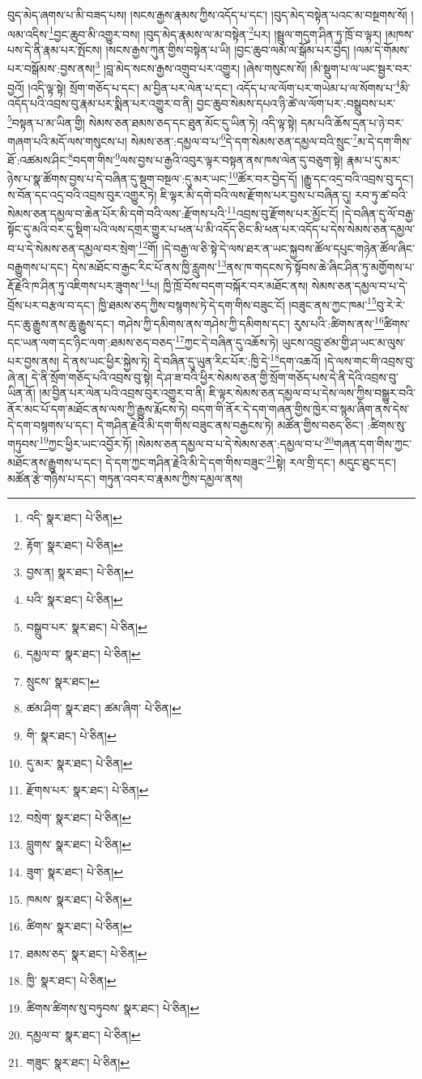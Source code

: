 བུད་མེད་ཞགས་པ་མི་བཟད་པས། །སངས་རྒྱས་རྣམས་ཀྱིས་འདོད་པ་དང་། །བུད་མེད་བསྟེན་པའང་མ་བསྔགས་སོ། །ལམ་འདིས་\footnote{འདི་  སྣར་ཐང་།  པེ་ཅིན། }བྱང་ཆུབ་མི་འགྱུར་བས། །བུད་མེད་རྣམས་ལ་མ་བསྟེན་\footnote{རྟོག་  སྣར་ཐང་།  པེ་ཅིན། }པར། །སྦྲུལ་གདུག་ཤིན་ཏུ་ཁྲོ་བ་ལྟར། །མཁས་པས་དེ་ནི་རྣམ་པར་སྤོངས། །སངས་རྒྱས་ཀུན་གྱིས་བསྟེན་པ་ཡི། །བྱང་ཆུབ་ལམ་ལ་སྒོམ་པར་བྱེད། །ལམ་དེ་གོམས་པར་བསྒོམས་:བྱས་ནས།\footnote{བྱས་ན།  སྣར་ཐང་།  པེ་ཅིན། } །བླ་མེད་སངས་རྒྱས་འགྲུབ་པར་འགྱུར། །ཞེས་གསུངས་སོ། །མི་སྡུག་པ་ལ་ཡང་སྦྱར་བར་བྱའོ། །འདི་ལྟ་སྟེ། སྲོག་གཅོད་པ་དང་། མ་བྱིན་པར་ལེན་པ་དང་། འདོད་པ་ལ་ལོག་པར་གཡེམ་པ་ལ་སོགས་པ་\footnote{པའི་  སྣར་ཐང་།  པེ་ཅིན། }མི་འདོད་པའི་འབྲས་བུ་རྣམ་པར་སྨིན་པར་འགྱུར་བ་ནི། བྱང་ཆུབ་སེམས་དཔའ་ཉི་ཚེ་ལ་ལོག་པར་:བསྒྲུབས་པར་\footnote{བསྒྲུབ་པར་  སྣར་ཐང་།  པེ་ཅིན། }བསྟན་པ་མ་ཡིན་གྱི། སེམས་ཅན་ཐམས་ཅད་དང་ཐུན་མོང་དུ་ཡིན་ཏེ། འདི་ལྟ་སྟེ། དམ་པའི་ཆོས་དྲན་པ་ཉེ་བར་གཞག་པའི་མདོ་ལས་གསུངས་པ། སེམས་ཅན་:དམྱལ་བ་པ་\footnote{དམྱལ་བ་  སྣར་ཐང་།  པེ་ཅིན། }དེ་དག་སེམས་ཅན་དམྱལ་བའི་སྲུང་\footnote{སྲུངས་  སྣར་ཐང་། }མ་དེ་དག་གིས་ཐོ་:འཚམས་ཤིང་\footnote{ཚམ་ཤིག་  སྣར་ཐང་། ཚམ་ཞིག་  པེ་ཅིན། }བདག་གིས་\footnote{གི་  སྣར་ཐང་།  པེ་ཅིན། }ལས་བྱས་པ་རྒྱའི་འབུར་ལྟར་བསྟན་ནས་ཁས་ལེན་དུ་བཅུག་སྟེ། རྣམ་པ་དུ་མར་ཉེས་པ་སྣ་ཚོགས་བྱས་པ་དེ་བཞིན་དུ་སྡུག་བསྔལ་:དུ་མར་ཡང་\footnote{དུ་མར་  སྣར་ཐང་།  པེ་ཅིན། }ཚོར་བར་བྱེད་དོ། །རྒྱུ་དང་འདྲ་བའི་འབྲས་བུ་དང་། ས་བོན་དང་འདྲ་བའི་འབྲས་བུར་འགྱུར་ཏེ། ཇི་ལྟར་མི་དགེ་བའི་ལས་རྫོགས་པར་བྱས་པ་བཞིན་དུ། རབ་ཏུ་ཚ་བའི་སེམས་ཅན་དམྱལ་བ་ཆེན་པོར་མི་དགེ་བའི་ལས་:རྫོགས་པའི་\footnote{རྫོགས་པར་  སྣར་ཐང་།  པེ་ཅིན། }འབྲས་བུ་རྫོགས་པར་མྱོང་ངོ། །དེ་བཞིན་དུ་ལོ་བརྒྱ་སྟོང་དུ་མའི་བར་དུ་སྡིག་པའི་ལས་དགྲར་གྱུར་པ་ཕན་པ་མི་འདོད་ཅིང་མི་ཕན་པར་འདོད་པ་དེས་སེམས་ཅན་དམྱལ་བ་པ་དེ་སེམས་ཅན་དམྱལ་བར་སྲེག་\footnote{བསྲེག་  སྣར་ཐང་།  པེ་ཅིན། }གོ། །དེ་བརྒྱ་ལ་ཅི་སྟེ་དེ་ལས་ཐར་ན་ཡང་སྐྱབས་ཚོལ་དཔུང་གཉེན་ཚོལ་ཞིང་བརྒྱུགས་པ་དང་། དེས་མཐོང་བ་རྒྱང་རིང་པོ་ནས་ཁྱི་རླུགས་\footnote{བླུགས་  སྣར་ཐང་།  པེ་ཅིན། }ནས་ཁ་གདངས་ཏེ་སྟོབས་ཆེ་ཞིང་ཤིན་ཏུ་མགྱོགས་པ་རྡོ་རྗེའི་ཁ་ཤིན་ཏུ་འཇིགས་པར་ཟུགས་\footnote{ཟུག་  སྣར་ཐང་།  པེ་ཅིན། }པ། ཁྱི་ཁྲོ་བོས་བདག་བསྐོར་བར་མཐོང་ནས། སེམས་ཅན་དམྱལ་བ་པ་དེ་བྲོས་པར་བརྩལ་བ་དང་། ཁྱི་ཐམས་ཅད་ཀྱིས་བསྙགས་ཏེ་དེ་དག་གིས་བཟུང་ངོ། །བཟུང་ནས་ཀྱང་ཁམ་\footnote{ཁམས་  སྣར་ཐང་།  པེ་ཅིན། }བུ་རེ་རེ་དང་ཆུ་རྒྱུས་ནས་ཆུ་རྒྱུས་དང་། གཤེས་ཀྱི་དམིགས་ནས་གཤེས་ཀྱི་དམིགས་དང་། རུས་པའི་:ཚིགས་ནས་\footnote{ཚིགས་  སྣར་ཐང་།  པེ་ཅིན། }ཚིགས་དང་ཡན་ལག་དང་ཉིང་ལག་:ཐམས་ཅད་བཅད་\footnote{ཐམས་ཅད་  སྣར་ཐང་།  པེ་ཅིན། }ཀྱང་དེ་བཞིན་དུ་འཆོས་ཏེ། ཡུངས་འབྲུ་ཙམ་གྱི་ཤ་ཡང་མ་ལུས་པར་བྱས་ནས། དེ་ནས་ཡང་ཕྱིར་སྐྱེས་ཏེ། དེ་བཞིན་དུ་ཡུན་རིང་པོར་:ཁྱི་དེ་\footnote{ཁྱི་  སྣར་ཐང་།  པེ་ཅིན། }དག་འཆའོ། །དེ་ལས་གང་གི་འབྲས་བུ་ཞེ་ན། དེ་ནི་སྲོག་གཅོད་པའི་འབྲས་བུ་སྟེ། དེ་ཤ་ཟ་བའི་ཕྱིར་སེམས་ཅན་གྱི་སྲོག་གཅོད་པས་དེ་ནི་དེའི་འབྲས་བུ་ཡིན་ནོ། །མ་བྱིན་པར་ལེན་པའི་འབྲས་བུར་འགྱུར་བ་ནི། ཇི་ལྟར་སེམས་ཅན་དམྱལ་བ་པ་དེས་ལས་ཀྱིས་བསྒྱུར་བའི་ནོར་མང་པོ་དག་མཐོང་ནས་ལས་ཀྱི་རྒྱུས་རྨོངས་ཏེ། བདག་གི་ནོར་དེ་དག་གཞན་གྱིས་ཁྱེར་བ་སྙམ་ཞིག་ནས་དེས་དེ་དག་བསྙགས་པ་དང་། དེ་གཤིན་རྗེའི་མི་དག་གིས་བཟུང་ནས་བརྒྱངས་ཏེ། མཚོན་གྱིས་བཅད་ཅིང་། :ཚིགས་སུ་གཏུབས་\footnote{ཚིགས་ཚིགས་སུ་བཏུབས་  སྣར་ཐང་།  པེ་ཅིན། }ཀྱང་ཕྱིར་ཡང་འབྱོར་ཏོ། །སེམས་ཅན་དམྱལ་བ་པ་དེ་སེམས་ཅན་:དམྱལ་བ་པ་\footnote{དམྱལ་བ་  སྣར་ཐང་།  པེ་ཅིན། }གཞན་དག་གིས་ཀྱང་མཐོང་ནས་རྒྱུགས་པ་དང་། དེ་དག་ཀྱང་གཤིན་རྗེའི་མི་དེ་དག་གིས་བཟུང་\footnote{གཟུང་  སྣར་ཐང་།  པེ་ཅིན། }སྟེ། རལ་གྲི་དང་། མདུང་ཐུང་དང་། མཚོན་རྩེ་གཉིས་པ་དང་། གཏུན་འབར་བ་རྣམས་ཀྱིས་དམྱལ་ནས། 